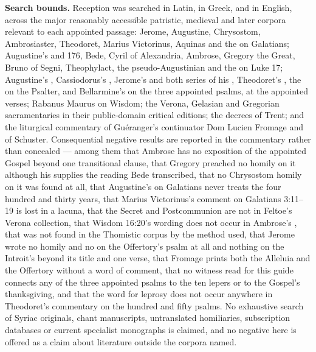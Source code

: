 \textbf{Search bounds.} Reception was searched in Latin, in Greek, and in
English, across the major reasonably accessible patristic, medieval and later
corpora relevant to each appointed passage: Jerome, Augustine, Chrysostom,
Ambrosiaster, Theodoret, Marius Victorinus, Aquinas and the  on Galatians; Augustine's  and
 176, Bede, Cyril of Alexandria, Ambrose, Gregory the Great, Bruno
of Segni, Theophylact, the pseudo-Augustinian  and the  on Luke 17; Augustine's
, Cassiodorus's , Jerome's
 and both series of his , Theodoret's
, the  on the Psalter, and
Bellarmine's  on the three appointed psalms, at the
appointed verses; Rabanus Maurus on Wisdom; the Verona, Gelasian and Gregorian
sacramentaries in their public-domain critical editions; the decrees of Trent;
and the liturgical commentary of Guéranger's continuator Dom Lucien Fromage and
of Schuster. Consequential negative
results are reported in the commentary rather than concealed --- among them
that Ambrose has no exposition of the appointed Gospel beyond one transitional
clause, that Gregory preached no homily on it although his 
supplies the reading Bede transcribed, that no Chrysostom homily on it was
found at all, that Augustine's  on Galatians never treats the
four hundred and thirty years, that Marius Victorinus's comment on Galatians
3:11--19 is lost in a lacuna, that the Secret and Postcommunion are not in
Feltoe's Verona collection, that Wisdom 16:20's wording does not occur in
Ambrose's , that 
was not found in the Thomistic corpus by the method used, that Jerome wrote no
homily and no  on the Offertory's psalm at all and
nothing on the Introit's beyond its title and one verse, that Fromage prints
both the Alleluia and the Offertory without a word of comment, that no witness
read for this guide connects any of the three appointed psalms to the ten
lepers or to the Gospel's thanksgiving, and that the word for leprosy does not
occur anywhere in Theodoret's commentary on the hundred and fifty psalms. No
exhaustive search
of Syriac originals, chant manuscripts, untranslated homiliaries, subscription
databases or current specialist monographs is claimed, and no negative here is
offered as a claim about literature outside the corpora named.

